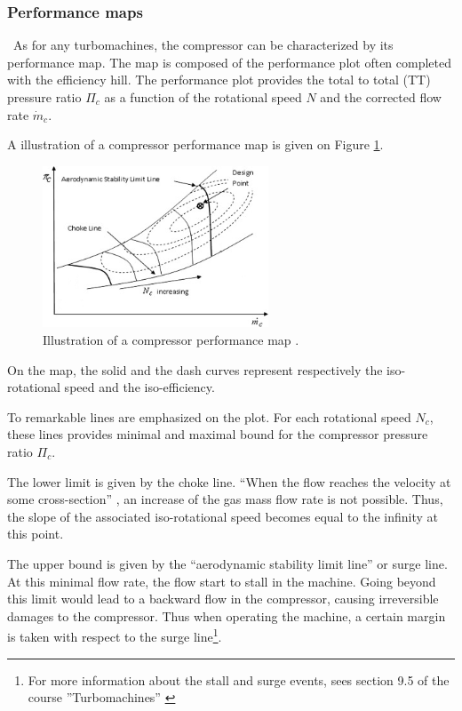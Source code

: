 \subsubsection{Performance maps}
\quad\ As for any turbomachines, the compressor can be characterized by its performance map. The map is composed of the performance plot often completed with the efficiency hill. The performance plot provides the total to total (TT) pressure ratio \(\Pi_c\) as a function of the rotational speed \(N\) and the corrected flow rate \(\dot{m}_c\).

A illustration of a compressor performance map is given on Figure \ref{fig:C3_compmap}.
\begin{figure}[h]
    \centering
    \includegraphics[width=0.6\textwidth]{Comp_Map.png}
    \caption{Illustration of a compressor performance map \cite{Ghorbanian2009}.}
    \label{fig:C3_compmap}
\end{figure}

On the map, the solid and the dash curves represent respectively the iso-rotational speed and the iso-efficiency.

To remarkable lines are emphasized on the plot. For each rotational speed \(N_c\), these lines provides minimal and maximal bound for the compressor pressure ratio \(\Pi_c\).

The lower limit is given by the choke line. “When the flow reaches the velocity at some cross-section” \cite{Ghorbanian2009}, an increase of the gas mass flow rate is not possible. Thus, the slope of the associated iso-rotational speed becomes equal to the infinity at this point.

The upper bound is given by the “aerodynamic stability limit line'' or surge line. At this minimal flow rate, the flow start to stall in the machine. Going beyond this limit would lead to a backward flow in the compressor, causing irreversible damages to the compressor. Thus when operating the machine, a certain margin is taken with respect to the surge line\footnote{For more information about the stall and surge events, sees section 9.5 of the course ''Turbomachines'' \cite{Hillewaert2019}}.

